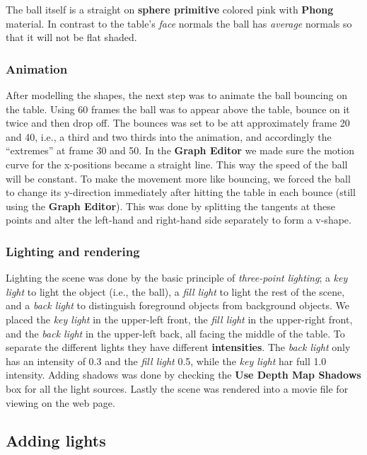 \documentclass[a4paper]{article}
\begin{document}
The ball itself is a straight on \textbf{sphere primitive} colored pink with
\textbf{Phong} material. In contrast to the table's \textit{face} normals the
ball has \textit{average} normals so that it will not be flat shaded. 

\subsubsection{Animation}
After modelling the shapes, the next step was to animate the ball bouncing on
the table. Using 60 frames the ball was to appear above the table, bounce on it
twice and then drop off. The bounces was set to be att approximately frame 20
and 40, i.e., a third and two thirds into the animation, and accordingly the
``extremes'' at frame 30 and 50. In the \textbf{Graph Editor} we made sure the
motion curve for the x-positions became a straight line. This way the speed of
the ball will be constant. To make the movement more like bouncing, we forced
the ball to change its y-direction immediately after hitting the table in each
bounce (still using the \textbf{Graph Editor}). This was done by splitting the
tangents at these points and alter the left-hand and right-hand side separately
to form a v-shape. 

\subsubsection{Lighting and rendering}
Lighting the scene was done by the basic principle of \textit{three-point
lighting}; a \textit{key light} to light the object (i.e., the ball), a
\textit{fill light} to light the rest of the scene, and a \textit{back light} to
distinguish foreground objects from background objects. We placed the
\textit{key light} in the upper-left front, the \textit{fill light} in the
upper-right front, and the \textit{back light} in the upper-left back, all
facing the middle of the table. To separate the different lights they have
different \textbf{intensities}. The \textit{back light} only has an intensity of
0.3 and the \textit{fill light} 0.5, while the \textit{key light} har full 1.0
intensity. Adding shadows was done by checking the \textbf{Use Depth Map
Shadows} box for all the light sources. Lastly the scene was rendered into a
movie file for viewing on the web page.

\subsection{Adding lights} %
\newpage
\end{document}
